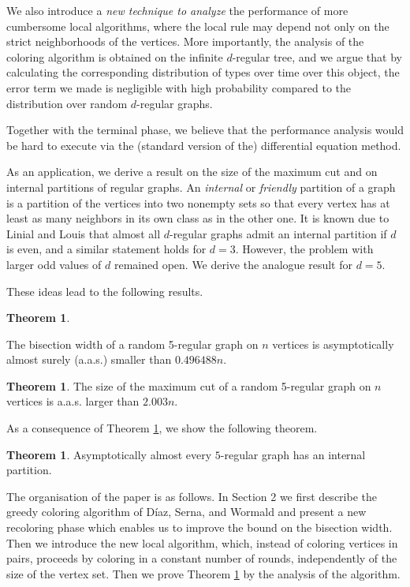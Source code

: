 \documentclass{article}
\theoremstyle{definition}
\newtheorem{theorem}[definition]{Theorem}
\begin{document}
We also introduce a \textit{new technique to analyze} the performance of more cumbersome local algorithms, where the local rule may depend not only on the strict neighborhoods of the vertices.
 More importantly, the analysis of the coloring algorithm is obtained on the infinite $d$-regular tree, and we argue that by calculating the corresponding distribution of types over time over this object, the error term we made is negligible with high probability compared to the distribution over random $d$-regular graphs. 
 
Together with the terminal phase, we believe that the performance analysis would be hard to execute via the (standard version of the) differential equation method. 

 	As an application, we derive a result on the size of the maximum cut and on internal partitions of regular graphs. An {\em internal} or {\em friendly} partition of a graph is a partition of the vertices into two nonempty sets so that every vertex has at least as many neighbors in its own class as in the other one. It is known due to Linial and Louis \cite{linial2020asymptotically} that almost all $d$-regular graphs admit an internal partition if $d$ is even, and a similar statement holds for $d=3$. However, the problem with larger odd values of $d$ remained open. We derive the analogue result for $d=5$.

These ideas lead to the following results.

\begin{theorem}\label{bisect}

The bisection width of a random 5-regular graph on $n$ vertices is asymptotically almost surely (a.a.s.) smaller than $0.496488n$.

\end{theorem}

\begin{theorem}\label{maxcut}
 The size of the maximum cut of a random 5-regular graph on $n$
vertices is a.a.s. larger than $2.003n$.
\end{theorem}

As a consequence of Theorem \ref{bisect}, we show the following theorem.
\begin{theorem}\label{internal}
 Asymptotically almost every $5$-regular graph has an internal partition.
\end{theorem}

\bigskip

The organisation of the paper is as follows. In Section 2 we first describe the greedy coloring algorithm of Díaz, Serna, and Wormald and present a new recoloring phase which enables us to improve the bound on the bisection width. Then we introduce the new local algorithm, which, instead of coloring vertices in pairs, proceeds by coloring in a constant number of rounds, independently of the size of the vertex set. Then we prove Theorem \ref{bisect} by the analysis of the algorithm.
\end{document}
